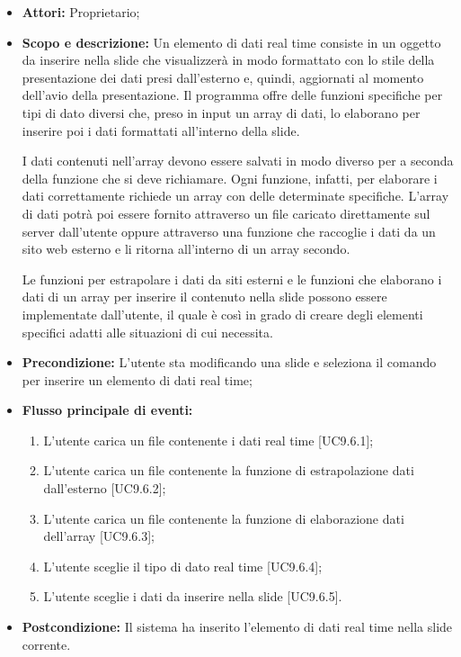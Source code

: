 \begin{itemize}
	\item \textbf{Attori:} Proprietario;
	\item \textbf{Scopo e descrizione:}	Un elemento di dati \gls{real time} consiste in un oggetto da inserire nella slide che visualizzerà in modo formattato con lo stile della presentazione dei dati presi dall'esterno e, quindi, aggiornati al momento dell'avio della presentazione. Il programma offre delle funzioni specifiche per tipi di dato diversi che, preso in input un array di dati, lo elaborano per inserire poi i dati formattati all'interno della slide.

	I dati contenuti nell'array devono essere salvati in modo diverso per a seconda della funzione che si deve richiamare. Ogni funzione, infatti, per elaborare i dati correttamente richiede un array con delle determinate specifiche.
	L'array di dati potrà poi essere fornito attraverso un file caricato direttamente sul server dall'utente oppure attraverso una funzione che raccoglie i dati da un sito web esterno e li ritorna all'interno di un array secondo.
	
	Le funzioni per estrapolare i dati da siti esterni e le funzioni che elaborano i dati di un array per inserire il contenuto nella slide possono essere implementate dall'utente, il quale è così in grado di creare degli elementi specifici adatti alle situazioni di cui necessita.
	
	\item \textbf{Precondizione:} L'utente sta modificando una \gls{slide} e seleziona il comando per inserire un elemento di dati \gls{real time};
	\item \textbf{Flusso principale di eventi:}
	\begin{enumerate}
		\item L'utente carica un file contenente i dati real time [UC9.6.1];
		\item L'utente carica un file contenente la funzione di estrapolazione dati dall'esterno [UC9.6.2];
		\item L'utente carica un file contenente la funzione di elaborazione dati dell'array [UC9.6.3];
		\item L'utente sceglie il tipo di dato \gls{real time} [UC9.6.4];
		\item L'utente sceglie i dati da inserire nella slide [UC9.6.5].
	\end{enumerate}
	\item \textbf{Postcondizione:} Il sistema ha inserito l'elemento di dati \gls{real time} nella \gls{slide} corrente.
\end{itemize}

